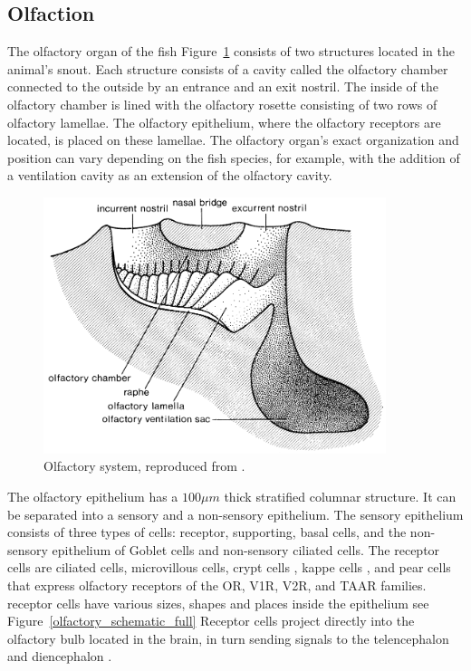     \subsection{Olfaction}
    The olfactory organ of the fish Figure~\ref{olfactory_schematic} consists of two structures located in the animal's snout. Each structure consists of a cavity called the olfactory chamber connected to the outside by an entrance and an exit nostril. The inside of the olfactory chamber is lined with the olfactory rosette consisting of two rows of olfactory lamellae. The olfactory epithelium, where the olfactory receptors are located, is placed on these lamellae. The olfactory organ's exact organization and position can vary depending on the fish species, for example, with the addition of a ventilation cavity as an extension of the olfactory cavity.

    \begin{figure}[h]
      \centering
      \includegraphics[width=10cm]{part_2/assets/olfactory_schematic.png}
      \caption{Olfactory system, reproduced from \cite{hara2012fish}.}
      \label{olfactory_schematic}
    \end{figure}


    The olfactory epithelium has a $100\mu m$ thick stratified columnar structure. It can be separated into a sensory and a non-sensory epithelium. The sensory epithelium consists of three types of cells: receptor, supporting, basal cells, and the non-sensory epithelium of Goblet cells and non-sensory ciliated cells. The receptor cells are ciliated cells, microvillous cells, crypt cells \cite{ichikawa1977fine,hansen2005diversity}, kappe cells \cite{ahuja2014kappe}, and pear cells \cite{wakisaka2017adenosine} that express olfactory receptors of the OR, V1R, V2R, and TAAR families. receptor cells have various sizes, shapes and places inside the epithelium see Figure~\ref{olfactory_schematic_full} Receptor cells project directly into the olfactory bulb located in the brain, in turn sending signals to the telencephalon and diencephalon \cite{miyasaka2009olfactory}.

